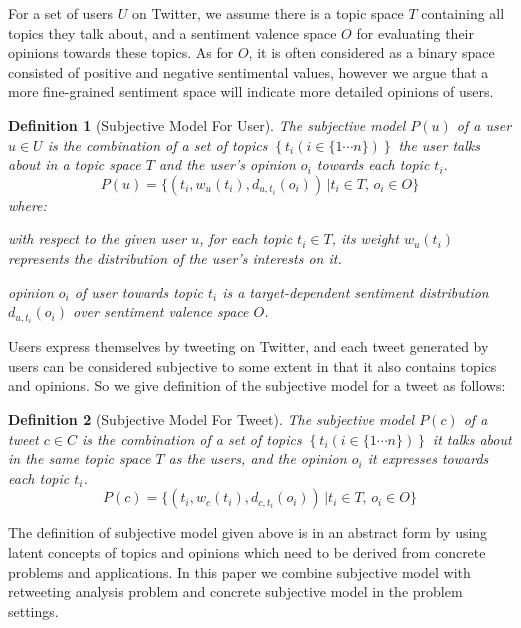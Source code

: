 \documentclass{acm_proc_article-sp}
\newtheorem{definition}{Definition}
\begin{document}
For a set of users $U$ on Twitter, we assume there is a topic space $T$ containing all topics they talk about, and a sentiment valence space $O$ for evaluating their opinions towards these topics. As for $O$, it is often considered as a binary space consisted of positive and negative sentimental values, however we argue that a more fine-grained sentiment space will indicate more detailed opinions of users. 
\begin{definition}[Subjective Model For User]
The subjective model $ P \left( u \right) $ of a user $u \in U $ is the combination of a set of topics $\left\lbrace  t_{i} \left( i \in \lbrace1 \cdots n \rbrace \right)  \right\rbrace $ the user talks about in a topic space $T$ and the user's opinion $o_{i}$ towards each topic $ t_{i} $. 
\begin{equation}
\label{usermodel}
P \left( u \right) = \lbrace \left( t_{i}, w_{u} \left( t_{i} \right), d_{u,t_{i}} \left( o_{i} \right) \right) \,\vert  t_{i} \in T, \, o_{i} \in O \rbrace
\end{equation}
where:
\begin{itemize*}
\item with respect to the given user $u$,  for each topic $t_{i} \in T$, its  weight $ w_{u} \left( t_{i} \right)$ represents the distribution of the user's interests on it.
\item opinion $o_{i}$ of user towards topic $t_{i}$ is a target-dependent sentiment distribution  $d_{u,t_{i}} \left( o_{i} \right)$ over sentiment valence space $O$.
\end{itemize*}
\end{definition}
Users express themselves by tweeting on Twitter, and each tweet generated by users can be considered subjective to some extent in that it also contains topics and opinions. So we give definition of the subjective model for a tweet as follows:
\begin{definition}[Subjective Model For Tweet]  
The subjective model $ P \left( c \right)  $ of a tweet $c \in C$ is the combination of a set of topics $\left\lbrace t_{i} \left( i \in \lbrace1 \cdots n \rbrace \right)  \right\rbrace$ it talks about in the same topic space $T$ as the users, and the opinion $o_{i}$ it expresses towards each topic $ t_{i} $.
\begin{equation}
\label{tweetmodel}
P \left( c \right) = \lbrace \left( t_{i}, w_{c} \left( t_{i} \right), d_{c,t_{i}} \left( o_{i} \right) \right) \,\vert  t_{i} \in T, \, o_{i} \in O \rbrace
\end{equation}
\end{definition}
The definition of subjective model given above is in an abstract form by using latent concepts of topics and opinions which need to be derived from concrete problems and applications. In this paper we combine subjective model with retweeting analysis problem and concrete subjective model in the problem settings.  
\end{document}

